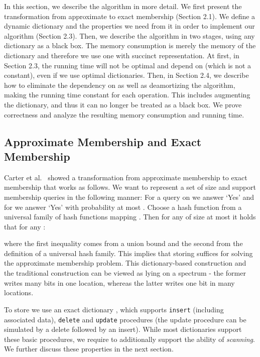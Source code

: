 \documentclass[11pt]{article}
\begin{document}
In this section, we describe the algorithm in more detail. We first present the transformation from approximate to exact membership (Section 2.1). We define a dynamic dictionary and the properties we need from it in order to implement our algorithm (Section 2.3). Then, we describe the algorithm in two stages, using any dictionary as a black box. The memory consumption is merely the memory of the dictionary and therefore we use one with succinct representation. At first, in Section 2.3, the running time will not be optimal and depend on  (which is not a constant), even if we use optimal dictionaries. Then, in Section 2.4, we describe how to eliminate the dependency on  as well as deamortizing the algorithm, making the running time constant for each operation. This includes augmenting the dictionary, and thus it can no longer be treated as a black box. We prove correctness and analyze the resulting memory consumption and running time.

\subsection{Approximate Membership and Exact Membership}\label{sec:approxToExact}
Carter et al.~\cite{CarterFGMW78} showed a transformation from approximate membership to exact membership that works as follows. We want to represent a set  of size  and support membership queries in the following manner: For a query on  we answer `Yes' and for  we answer `Yes' with probability at most . Choose a hash function  from a universal family of hash functions mapping . Then for any  of size at most  it holds that for any :

where the first inequality comes from a union bound and the second from the definition of a universal hash family. This implies that storing  suffices for solving the approximate membership problem. This dictionary-based construction and the traditional construction can be viewed as lying on a spectrum - the former writes many bits in one location, whereas the latter writes one bit in many locations.

To store  we use an exact dictionary , which supports \texttt{insert} (including associated data), \texttt{delete} and \texttt{update} procedures (the update procedure can be simulated by a delete followed by an insert). While most dictionaries support these basic procedures, we require  to additionally support the ability of \emph{scanning}. We further discuss these properties in the next section.\\
\end{document}

